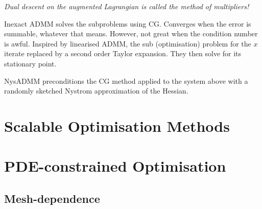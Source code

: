 \emph{Dual descent on the augmented Lagrangian is called the
method of multipliers!}


Inexact ADMM solves the subproblems using CG. Converges when the
error is summable, whatever that means. However, not great when
the condition number is awful. Inspired by linearised ADMM, the
sub (optimisation) problem for the $x$ iterate replaced by a second
order Taylor expansion. They then solve for its stationary point.

NysADMM preconditions the CG method applied to the system above
with a randomly sketched Nystrom approximation of the Hessian.

\section{Scalable Optimisation Methods}


\section{PDE-constrained Optimisation}


\subsection{Mesh-dependence}
